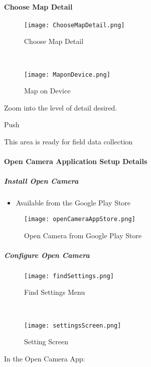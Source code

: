 \vspace{1.5in}

  \lookArrow
 \vspace{.2in}

 \clearpage
 \paragraph[Choose Map Detail]{Choose Map Detail\texorpdfstring{\\}{}}
 \begin{wrapfigure}{r}{0.5\textwidth}
 \centering
     \texttt{[image: ChooseMapDetail.png]}
 \caption{Choose Map Detail}
 \vspace{.25in}

 \HRule \\[.4cm] %
 \vspace{.25in}

     \texttt{[image: MaponDevice.png]}
 \caption{Map on Device}
 \end{wrapfigure}
 Zoom into the level of detail desired.
 \vspace{1in}

 \noindent Push  \lookArrow
 \vspace{3.5in}

 \noindent This area is ready for field data collection \lookArrow
 \clearpage
 \paragraph{Open Camera Application Setup Details}
 \subparagraph{Install Open Camera}
 \begin{itemize}
 \item Available from the Google Play Store
 \end{itemize}
 \begin{figure}[h!]
 \centering
     \texttt{[image: openCameraAppStore.png]}
 \caption{Open Camera from Google Play Store}
 \end{figure}

 \clearpage
 \subparagraph{Configure Open Camera}
 \begin{wrapfigure}{r}{0.5\textwidth}
 \centering
     \texttt{[image: findSettings.png]}
 \caption{Find Settings Menu}
 \vspace{.25in}

 \HRule \\[.4cm] %
 \vspace{.25in}

     \texttt{[image: settingsScreen.png]}
 \caption{Setting Screen}
 \end{wrapfigure}
 In the Open Camera App:
 \vspace{2.5in}

